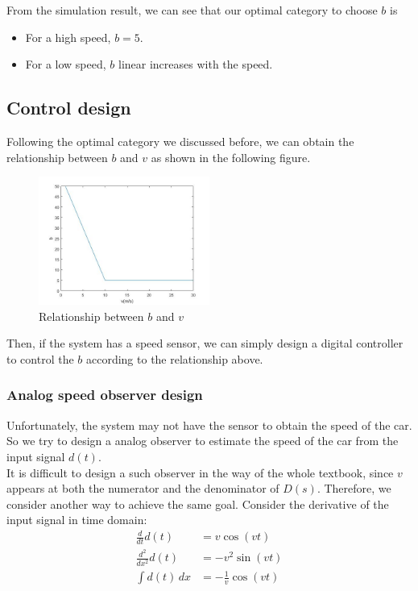 \documentclass{article}
\begin{document}
From the simulation result, we can see that our optimal category to choose $b$ is
\begin{itemize}
    \item For a high speed, $b=5$.
    \item For a low speed, $b$ linear increases with the speed.
\end{itemize}

\subsection{Control design}

Following the optimal category we discussed before, we can obtain the relationship between $b$ and $v$
as shown in the following figure.\\

\begin{figure}[htbp]
    \centering
    \includegraphics[width=0.5\textwidth]{13.jpg}
    \caption{Relationship between $b$ and $v$}
\end{figure}

Then, if the system has a speed sensor,
we can simply design a digital controller to control the $b$ according to the relationship above.\\


\subsubsection{Analog speed observer design}

Unfortunately, the system may not have the sensor to obtain the speed of the car.
So we try to design a analog observer to estimate the speed of the car from the input signal $d(t)$.\\

It is difficult to design a such observer in the way of the whole textbook,
since $v$ appears at both the numerator and the denominator of $D(s)$.
Therefore, we consider another way to achieve the same goal.
Consider the derivative of the input signal in time domain:
\begin{align*}
    \frac{d }{d t}d(t) &=v\cos(vt)\\
    \frac{d^2}{d x^2} d(t) &=-v^2\sin(vt)\\
    \int d(t) \,dx &= -\frac{1}{v}\cos(vt)
\end{align*}\\
\end{document}
